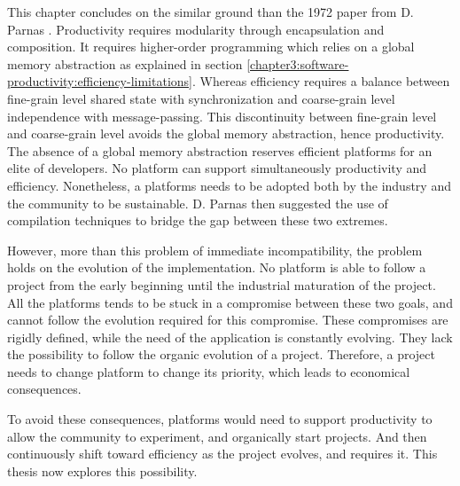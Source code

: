 This chapter concludes on the similar ground than the 1972 paper from D. Parnas \cite{Parnas1972}.
Productivity requires modularity through encapsulation and composition.
It requires higher-order programming which relies on a global memory abstraction as explained in section \ref{chapter3:software-productivity:efficiency-limitations}.
Whereas efficiency requires a balance between fine-grain level shared state with synchronization and coarse-grain level independence with message-passing.
This discontinuity between fine-grain level and coarse-grain level avoids the global memory abstraction, hence productivity.
The absence of a global memory abstraction reserves efficient platforms for an elite of developers.
No platform can support simultaneously productivity and efficiency.
Nonetheless, a platforms needs to be adopted both by the industry and the community to be sustainable.
D. Parnas then suggested the use of compilation techniques to bridge the gap between these two extremes.

However, more than this problem of immediate incompatibility, the problem holds on the evolution of the implementation.
No platform is able to follow a project from the early beginning until the industrial maturation of the project.
All the platforms tends to be stuck in a compromise between these two goals, and cannot follow the evolution required for this compromise.
These compromises are rigidly defined, while the need of the application is constantly evolving.
They lack the possibility to follow the organic evolution of a project.
Therefore, a project needs to change platform to change its priority, which leads to economical consequences.

To avoid these consequences, platforms would need to support productivity to allow the community to experiment, and organically start projects.
And then continuously shift toward efficiency as the project evolves, and requires it.
This thesis now explores this possibility.

                                    \endinput


Some links I NEED to put :
--------------------------

http://calculist.org/blog/2011/12/14/why-coroutines-wont-work-on-the-web/

Albert Cohen
https://scholar.google.com/citations?user=MkKZKAMAAAAJ&hl=en

